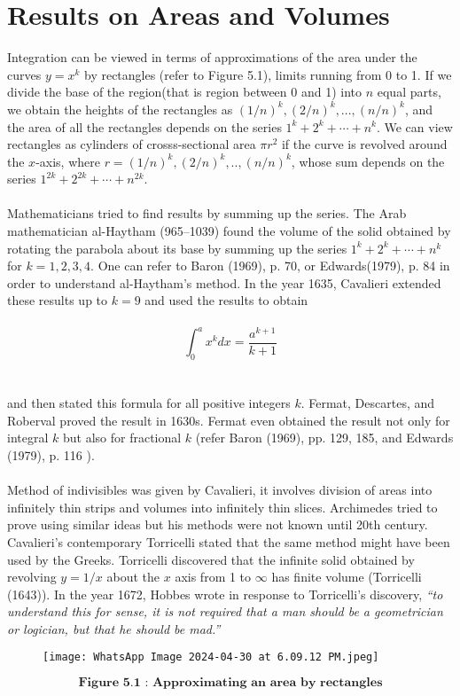 \documentclass[a4paper,reqno,11pt]{amsart}
\theoremstyle{plain}%
\begin{document}
\section{Results on Areas and Volumes}
Integration can be viewed in terms of approximations of the area under the curves $y = x^k$ by rectangles (refer to Figure 5.1), limits running from 0 to 1. If we divide the base of the region(that is region between 0 and 1) into $n$ equal parts, we obtain the heights of the rectangles as $(1/n)^k,(2/n)^k,...,(n/n)^k$, and the area of all the rectangles depends on the series $1^k + 2^k + \cdots + n^k$. We can view rectangles as cylinders of crosss-sectional area $\pi r^2$ if the curve is revolved around the $x$-axis, where $r = (1/n)^k,(2/n)^k,..,(n/n)^k$, whose sum depends on the series $ 1^{2k} + 2^{2k} + \cdots + n^{2k}$.\\
\\
\indent Mathematicians tried to find results by summing up the series. The Arab mathematician al-Haytham (965–1039) found the volume of the solid obtained by rotating the parabola about its base by summing up the series $1^k + 2^k + \cdots + n^k$ for $k = 1, 2, 3, 4$. One can refer to Baron (1969), p. 70, or Edwards(1979), p. 84 in order to understand al-Haytham’s method. In the year 1635, Cavalieri extended these results up to $k = 9$ and used the results to obtain\\
\\
$$\int_{0}^{a} x^k dx = \frac{a^{k+1}}{k+1}$$
\\
\\
and then stated this formula for all positive integers $k$. Fermat, Descartes, and Roberval proved the result in 1630s. Fermat even obtained the result not only for integral $k$ but also for fractional $k$ (refer Baron (1969), pp. 129, 185, and Edwards (1979), p. 116 \cite{ref 2}).\\
\\
\indent Method of indivisibles was given by Cavalieri, it involves division of areas into infinitely thin strips and volumes into infinitely thin slices. Archimedes tried to prove using similar ideas but his methods were not known until 20th century. Cavalieri’s contemporary Torricelli stated that the same method might have been used by the Greeks. Torricelli discovered that the infinite solid obtained by revolving
$y = 1/x$ about the $x$ axis from 1 to $\infty$ has finite volume (Torricelli (1643)). In the year 1672, Hobbes wrote in response to Torricelli's discovery, \textit{“to understand this for sense, it is not required that a man should
be a geometrician or logician, but that he should be mad.”}
\newpage
\begin{figure}
\texttt{[image: WhatsApp Image 2024-04-30 at 6.09.12 PM.jpeg]}
\end{figure}
$$\textbf{Figure 5.1 : Approximating an area by rectangles}$$
\end{document}
